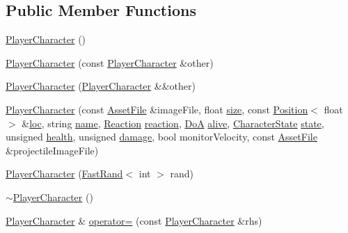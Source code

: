 \subsection*{Public Member Functions}
\begin{DoxyCompactItemize}
\item 
\hyperlink{class_player_character_af3ac12a41f58d860fb716138578bd95f}{Player\-Character} ()
\item 
\hyperlink{class_player_character_a39481690d96f66691b7a2f85a305f1f3}{Player\-Character} (const \hyperlink{class_player_character}{Player\-Character} \&other)
\item 
\hyperlink{class_player_character_aea36ba3a5672379d3b1daa80eb953de6}{Player\-Character} (\hyperlink{class_player_character}{Player\-Character} \&\&other)
\item 
\hyperlink{class_player_character_a08c4626862a0bf81f7dc8de90e883c1c}{Player\-Character} (const \hyperlink{struct_asset_file}{Asset\-File} \&image\-File, float \hyperlink{class_game_object_ac4637e122291be2421c851e2a87fb968}{size}, const \hyperlink{struct_position}{Position}$<$ float $>$ \&\hyperlink{class_game_object_a6858e668e7d2c5ded850b952aaacd905}{loc}, string \hyperlink{class_character_a2d423654566d1bf2160fef74bf04cc84}{name}, \hyperlink{_character_data_8h_a0e5ce1612c1e71823c97a9cd734de339}{Reaction} \hyperlink{class_character_a579933775b2e4e97465bacb09c4e87f5}{reaction}, \hyperlink{_character_data_8h_acbff4d7298e294294555d39178aad448}{Do\-A} \hyperlink{class_character_ac83b99be690bb41b7fae53e9457838c6}{alive}, \hyperlink{_character_data_8h_aacbb008a93d24b04a8779bbdbd8880b5}{Character\-State} \hyperlink{class_character_ac20f1ebda238017ddc245ecdce827037}{state}, unsigned \hyperlink{class_character_ae8c0d82624dc3a171e2c3b42c699151e}{health}, unsigned \hyperlink{class_character_ae6a140637ffe5004179d90a0e04a411b}{damage}, bool monitor\-Velocity, const \hyperlink{struct_asset_file}{Asset\-File} \&projectile\-Image\-File)
\item 
\hyperlink{class_player_character_a86f9249d7ef692f6647ffba3ae033cc0}{Player\-Character} (\hyperlink{class_fast_rand}{Fast\-Rand}$<$ int $>$ rand)
\item 
\hyperlink{class_player_character_a4915330a9f743156b6860a97e6d68e28}{$\sim$\-Player\-Character} ()
\item 
\hyperlink{class_player_character}{Player\-Character} \& \hyperlink{class_player_character_a3b949510e58a60e13e1a71d6c070c22b}{operator=} (const \hyperlink{class_player_character}{Player\-Character} \&rhs)
\item 

\end{DoxyCompactItemize}
